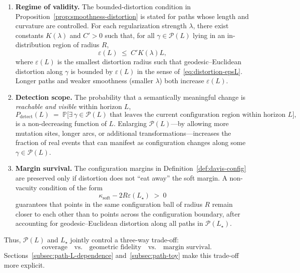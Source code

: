 \documentclass[11pt]{article}
\begin{document}
\begin{enumerate}[label=(R\arabic*), leftmargin=*]
  \item \textbf{Regime of validity.} The bounded-distortion condition in Proposition~\ref{prop:smoothness-distortion}
  is stated for paths whose length and curvature are controlled.
  For each regularization strength $\lambda$, there exist constants $K(\lambda)$ and $C'>0$ such that,
  for all $\gamma \in \mathcal{P}(L)$ lying in an in-distribution region of radius $R$,
  \begin{equation}
    \label{eq:epsL-scaling}
    \varepsilon(L) \;\le\; C' K(\lambda) L,
  \end{equation}
  where $\varepsilon(L)$ is the smallest distortion radius such that geodesic--Euclidean
  distortion along $\gamma$ is bounded by $\varepsilon(L)$ in the sense of~\eqref{eq:distortion-epsL}.
  Longer paths and weaker smoothness (smaller $\lambda$) both increase $\varepsilon(L)$.

  \item \textbf{Detection scope.} The probability that a semantically meaningful change is
  \emph{reachable and visible} within horizon $L$,
  \[
  P_{\mathrm{detect}}(L) \;=\; \mathbb{P}\big[\exists\,\gamma \in \mathcal{P}(L)
    \text{ that leaves the current configuration region within horizon }L\big],
  \]
  is a non-decreasing function of $L$. Enlarging $\mathcal{P}(L)$---by allowing more mutation sites,
  longer arcs, or additional transformations---increases the fraction of real events that can
  manifest as configuration changes along some $\gamma \in \mathcal{P}(L)$.

  \item \textbf{Margin survival.} The configuration margins in
  Definition~\ref{def:davis-config} are preserved only if distortion does not ``eat away'' the soft
  margin. A non-vacuity condition of the form
  \begin{equation}
    \label{eq:non-vac-path}
    \kappa_{\mathrm{soft}} - 2 R \varepsilon(L_\star) \;>\; 0
  \end{equation}
  guarantees that points in the same configuration ball of radius $R$ remain closer to each other
  than to points across the configuration boundary, after accounting for geodesic--Euclidean
  distortion along all paths in $\mathcal{P}(L_\star)$.
\end{enumerate}

Thus, $\mathcal{P}(L)$ and $L_\star$ jointly control a three-way trade-off:
\[
\text{coverage} \quad\text{vs.}\quad \text{geometric fidelity} \quad\text{vs.}\quad \text{margin survival}.
\]
Sections~\ref{subsec:path-L-dependence} and~\ref{subsec:path-toy} make this trade-off more explicit.
\end{document}
